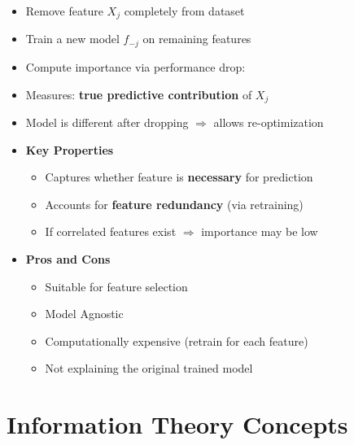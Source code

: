\documentclass[10pt,a4paper]{article}
\begin{document}
	\begin{itemize}
	\item Remove feature $X_j$ completely from dataset
	\item Train a new model $f_{-j}$ on remaining features
	\item Compute importance via performance drop:
	\item Measures: \textbf{true predictive contribution} of $X_j$
	\item Model is different after dropping $\Rightarrow$ allows re-optimization
	\item \textbf{Key Properties}
	\begin{itemize}
	    \item Captures whether feature is \textbf{necessary} for prediction
	    \item Accounts for \textbf{feature redundancy} (via retraining)
	    \item If correlated features exist $\Rightarrow$ importance may be low
	\end{itemize}
	
	\item \textbf{Pros and Cons}
	\begin{itemize}
	    \item Suitable for feature selection
	    \item Model Agnostic
	    \item Computationally expensive (retrain for each feature)
	    \item Not explaining the original trained model
	\end{itemize}
	\end{itemize}


	\section{Information Theory Concepts}
\end{document}
